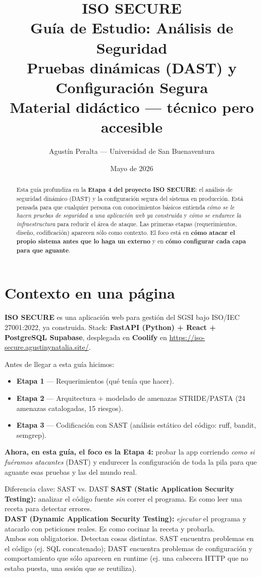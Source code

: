 \documentclass[12pt,a4paper,oneside]{article}
\title{
  {\Huge \textbf{ISO SECURE}}\\
  {\LARGE Guía de Estudio: Análisis de Seguridad}\\[2ex]
  {\Large \textcolor{accent}{Pruebas dinámicas (DAST) y Configuración Segura}}\\[1ex]
  {\small Material didáctico --- técnico pero accesible}
}
\author{Agustín Peralta --- Universidad de San Buenaventura}
\date{Mayo de 2026}
\begin{document}
\maketitle

\begin{abstract}
Esta guía profundiza en la \textbf{Etapa 4 del proyecto ISO SECURE}: el análisis de seguridad dinámico (DAST) y la configuración segura del sistema en producción. Está pensada para que cualquier persona con conocimientos básicos entienda \textit{cómo se le hacen pruebas de seguridad a una aplicación web ya construida} y \textit{cómo se endurece la infraestructura} para reducir el área de ataque. Las primeras etapas (requerimientos, diseño, codificación) aparecen sólo como contexto. El foco está en \textbf{cómo atacar el propio sistema antes que lo haga un externo} y en \textbf{cómo configurar cada capa para que aguante}.
\end{abstract}

\tableofcontents
\newpage

\section{Contexto en una página}

\textbf{ISO SECURE} es una aplicación web para gestión del SGSI bajo ISO/IEC 27001:2022, ya construida. Stack: \textbf{FastAPI (Python) + React + PostgreSQL Supabase}, desplegada en \textbf{Coolify} en \url{https://iso-secure.agustinynatalia.site/}.

Antes de llegar a esta guía hicimos:
\begin{itemize}[leftmargin=*]
  \item \textbf{Etapa 1} — Requerimientos (qué tenía que hacer).
  \item \textbf{Etapa 2} — Arquitectura + modelado de amenazas STRIDE/PASTA (24 amenazas catalogadas, 15 riesgos).
  \item \textbf{Etapa 3} — Codificación con SAST (análisis estático del código: ruff, bandit, semgrep).
\end{itemize}

\textbf{Ahora, en esta guía, el foco es la Etapa 4:} probar la app corriendo \textit{como si fuéramos atacantes} (DAST) y endurecer la configuración de toda la pila para que aguante esas pruebas y las del mundo real.

\begin{infobox}{Diferencia clave: SAST vs. DAST}
\textbf{SAST (Static Application Security Testing):} analizar el código fuente \emph{sin} correr el programa. Es como leer una receta para detectar errores.\\[1ex]
\textbf{DAST (Dynamic Application Security Testing):} \emph{ejecutar} el programa y atacarlo con peticiones reales. Es como cocinar la receta y probarla.\\[1ex]
Ambos son obligatorios. Detectan cosas distintas. SAST encuentra problemas en el código (ej. SQL concatenado); DAST encuentra problemas de configuración y comportamiento que sólo aparecen en runtime (ej. una cabecera HTTP que no estaba puesta, una sesión que se reutiliza).
\end{infobox}
\end{document}
